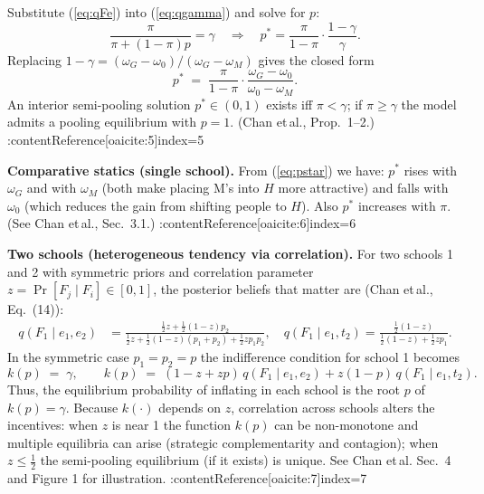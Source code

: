 Substitute (\ref{eq:qFe}) into (\ref{eq:qgamma}) and solve for \(p\):
\[
\frac{\pi}{\pi+(1-\pi)p}=\gamma
\quad\Longrightarrow\quad
p^*=\frac{\pi}{1-\pi}\cdot\frac{1-\gamma}{\gamma}.
\]
Replacing \(1-\gamma=(\omega_G-\omega_0)/(\omega_G-\omega_M)\) gives the closed form
\begin{equation}
p^* \;=\; \frac{\pi}{1-\pi}\cdot\frac{\omega_G-\omega_0}{\omega_0-\omega_M}. \label{eq:pstar}
\end{equation}
An interior semi-pooling solution \(p^*\in(0,1)\) exists iff \(\pi<\gamma\); if \(\pi\ge\gamma\) the model admits a pooling equilibrium with \(p=1\). (Chan et\,al., Prop.\ 1–2.) :contentReference[oaicite:5]{index=5}

\medskip
\noindent\textbf{Comparative statics (single school).} From (\ref{eq:pstar}) we have: \(p^*\) rises with \(\omega_G\) and with \(\omega_M\) (both make placing M’s into \(H\) more attractive) and falls with \(\omega_0\) (which reduces the gain from shifting people to \(H\)). Also \(p^*\) increases with \(\pi\). (See Chan et\,al., Sec.\ 3.1.) :contentReference[oaicite:6]{index=6}

\medskip
\noindent\textbf{Two schools (heterogeneous tendency via correlation).}  
For two schools 1 and 2 with symmetric priors and correlation parameter \(z=\Pr[F_j\mid F_i]\in[0,1]\), the posterior beliefs that matter are (Chan et\,al., Eq.\ (14)):
\begin{align}
q(F_1\mid e_1,e_2) &= \frac{\tfrac12 z + \tfrac12(1-z)p_2}{\tfrac12 z + \tfrac12(1-z)(p_1+p_2)+\tfrac12 z p_1 p_2}, 
\quad
q(F_1\mid e_1,t_2)=\frac{\tfrac12(1-z)}{\tfrac12(1-z)+\tfrac12 z p_1}. \label{eq:q14}
\end{align}
In the symmetric case \(p_1=p_2=p\) the indifference condition for school 1 becomes
\begin{equation}
k(p)\;=\;\gamma,\qquad
k(p) \;=\; (1-z+zp)\,q(F_1\mid e_1,e_2) + z(1-p)\,q(F_1\mid e_1,t_2). \label{eq:kp}
\end{equation}
Thus, the equilibrium probability of inflating in each school is the root \(p\) of \(k(p)=\gamma\). Because \(k(\cdot)\) depends on \(z\), correlation across schools alters the incentives: when \(z\) is near 1 the function \(k(p)\) can be non-monotone and multiple equilibria can arise (strategic complementarity and contagion); when \(z\le\frac12\) the semi-pooling equilibrium (if it exists) is unique. See Chan et\,al. Sec.\ 4 and Figure 1 for illustration. :contentReference[oaicite:7]{index=7}

